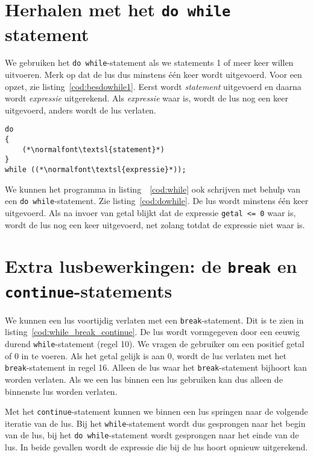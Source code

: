 \section{Herhalen met het \texttt{do while} statement}
We gebruiken het \texttt{do while}-statement als we statements 1 of meer keer willen uitvoeren. Merk op dat de lus dus minstens één keer wordt uitgevoerd. Voor een opzet, zie listing~\ref{cod:besdowhile1}. Eerst wordt \textsl{statement} uitgevoerd en daarna wordt \textsl{expressie} uitgerekend. Als \textsl{expressie} waar is, wordt de lus nog een keer uitgevoerd, anders wordt de lus verlaten.

\begin{lstlisting}[caption=Opzet \texttt{while}-statement.,label=cod:besdowhile1]
do
{
    (*\normalfont\textsl{statement}*)
}
while ((*\normalfont\textsl{expressie}*));
\end{lstlisting}

We kunnen het programma in listing~~\ref{cod:while} ook schrijven met behulp van een \texttt{do while}-statement. Zie listing~\ref{cod:dowhile}. De lus wordt minstens één keer uitgevoerd. Als na invoer van getal blijkt dat de expressie \texttt{getal <= 0} waar is, wordt de lus nog een keer uitgevoerd, net zolang totdat de expressie niet waar is.
 


\section{Extra lusbewerkingen: de \texttt{break} en \texttt{continue}-statements}
We kunnen een lus voortijdig verlaten met een \texttt{break}-statement. Dit is te zien in listing~\ref{cod:while_break_continue}. De lus wordt vormgegeven door een eeuwig durend \texttt{while}-statement (regel 10). We vragen de gebruiker om een positief getal of 0 in te voeren. Als het getal gelijk is aan 0, wordt de lus verlaten met het \texttt{break}-statement in regel 16. Alleen de lus waar het \texttt{break}-statement bijhoort kan worden verlaten. Als we een lus binnen een lus gebruiken kan dus alleen de binnenste lus worden verlaten.

Met het \texttt{continue}-statement kunnen we binnen een lus springen naar de volgende iteratie van de lus. Bij het \texttt{while}-statement wordt dus gesprongen naar het begin van de lus, bij het \texttt{do while}-statement wordt gesprongen naar het einde van de lus. In beide gevallen wordt de expressie die bij de lus hoort opnieuw uitgerekend.

